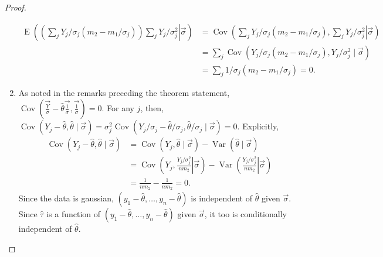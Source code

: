 \documentclass[12pt]{article}
\newcommand{\m}{m}
\newcommand{\s}{S}
\newcommand{\y}{Y}
\DeclareMathOperator{\E}{E}
\DeclareMathOperator{\var}{Var}
\DeclareMathOperator{\cov}{Cov}
\begin{document}
\begin{proof}
\begin{enumerate}
        \begin{align}
             \E\left(\left.\left(\sum_j \y_j/\sigma_j(\m_2-\m_1/\sigma_j)\right)\sum_j\y_j/\sigma_j^2 \right| \vec\sigma \right)
      &=
        \cov\left(\left.\sum_j \y_j/\sigma_j(\m_2-\m_1/\sigma_j),\sum_j\y_j/\sigma_j^2 \right| \vec\sigma \right)\\
                                                           &= \sum_j\cov(\y_j/\sigma_j(\m_2-\m_1/\sigma_j),\y_j/\sigma_j^2 \mid \vec\sigma)\\
      &= \sum_j1/\sigma_j(\m_2-\m_1/\sigma_j)=0.
    \end{align}%

  \item As noted in the remarks preceding the theorem statement, $\cov(\vec{\frac{\y}{\sigma}}-\hat\theta \vec{\frac{1}{\sigma}},\vec{\frac{1}{\sigma}})=0$. For any $j$, then, $\cov(\y_j-\hat\theta,\hat\theta \mid \vec\sigma)=\sigma_j^2\cov(\y_j/\sigma_j-\hat\theta/\sigma_j,\hat\theta/\sigma_j \mid \vec\sigma)=0.$ %
    Explicitly,
    \begin{align}
      \cov(\y_j-\hat\theta,\hat\theta \mid \vec\sigma) &= \cov(\y_j,\hat\theta \mid \vec\sigma) - \var(\hat\theta \mid \vec\sigma)\\
                                                       &= \cov\left(\left.\y_j, \frac{\y_j/\sigma_j^2}{n\m_2} \right| \vec\sigma\right) - \var\left(\left.\frac{\y_j/\sigma_j^2}{n\m_2} \right| \vec\sigma \right)\\
      &= \frac{1}{n\m_2} - \frac{1}{n\m_2} = 0.
    \end{align}
    Since the data is gaussian,
    $(y_1-\hat\theta,\ldots,y_n-\hat\theta)$ is independent of
    $\hat\theta$ given $\vec\sigma$. Since $\hat\tau$ is a function of
    $(y_1-\hat\theta,\ldots,y_n-\hat\theta)$ given $\vec\sigma$, it
    too is conditionally independent of $\hat\theta$.
  \end{enumerate}
\end{proof}
\end{document}
